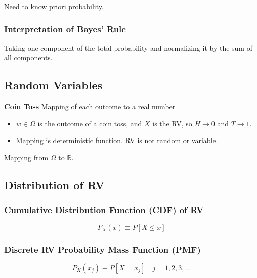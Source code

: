 \begin{warning}
    Need to know priori probability.
\end{warning}

\subsubsection{Interpretation of Bayes' Rule}
\begin{notes}
    Taking one component of the total probability and normalizing it by the sum of all components.
\end{notes}

\subsection{Random Variables}
\begin{motivation} \textbf{Coin Toss}
    Mapping of each outcome to a real number
    \begin{itemize}
        \item $w \in \Omega$ is the outcome of a coin toss, and $X$ is the RV, so $H \rightarrow 0$ and $T \rightarrow 1$.
    \end{itemize}
    \begin{itemize}
        \item Mapping is deterministic function. RV is not random or variable.
    \end{itemize}
\end{motivation}

\begin{definition}
    Mapping from $\Omega$ to $\mathbb{R}$.
\end{definition}

\subsection{Distribution of RV}

\subsubsection{Cumulative Distribution Function (CDF) of RV}
\begin{definition}
    \begin{equation}
        F_X(x) \equiv P[X \leq x]
    \end{equation}
\end{definition}

\subsubsection{Discrete RV Probability Mass Function (PMF)}
\begin{definition}
    \begin{equation}
        P_X(x_j) \equiv P[X=x_j] \quad j=1,2,3,\ldots 
    \end{equation}
\end{definition}

